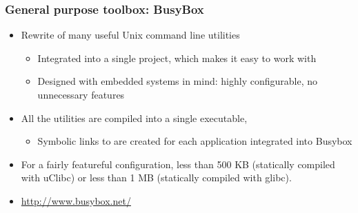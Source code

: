 \begin{frame}
  \frametitle{General purpose toolbox: BusyBox}
  \begin{itemize}
  \item Rewrite of many useful Unix command line utilities
    \begin{itemize}
    \item Integrated into a single project, which makes it easy to
      work with
    \item Designed with embedded systems in mind: highly configurable,
      no unnecessary features
    \end{itemize}
  \item All the utilities are compiled into a single executable,
    \begin{itemize}
    \item Symbolic links to  are created for each
      application integrated into Busybox
    \end{itemize}
  \item For a fairly featureful configuration, less than 500 KB
    (statically compiled with uClibc) or less than 1 MB (statically
    compiled with glibc).
  \item   \url{http://www.busybox.net/}
  \end{itemize}
\end{frame}


